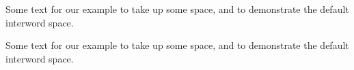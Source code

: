   Some text for our example to take
  up some space, and to demonstrate
  the default interword space.
  \bigskip

  Some text for our example to take
  up some space, and to demonstrate
  the default interword space.
